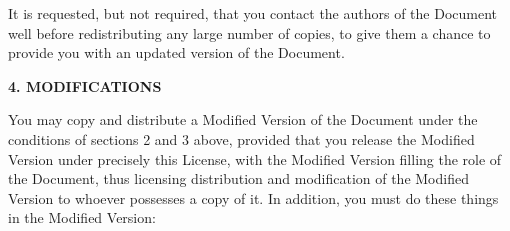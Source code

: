 It is requested, but not required, that you contact the authors of the
Document well before redistributing any large number of copies, to give
them a chance to provide you with an updated version of the Document.


\begin{center}
{\Large\bf 4. MODIFICATIONS\par}
\end{center}

You may copy and distribute a Modified Version of the Document under
the conditions of sections 2 and 3 above, provided that you release
the Modified Version under precisely this License, with the Modified
Version filling the role of the Document, thus licensing distribution
and modification of the Modified Version to whoever possesses a copy
of it.  In addition, you must do these things in the Modified Version:

